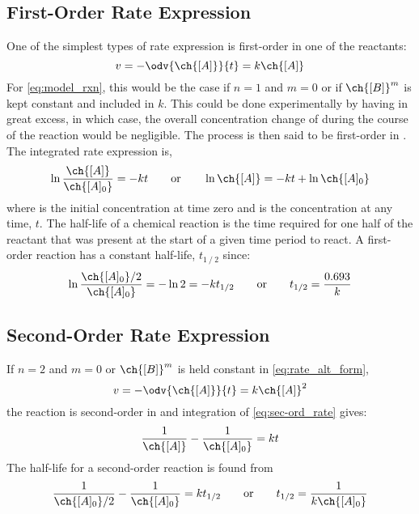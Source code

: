 \subsection{First-Order Rate Expression}
\label{subs:first-order_rate_expr}
One of the simplest types of rate expression is first-order in one of the reactants:
\begin{equation}
	v = -\odv{\ch{[A]}}{t} = k \ch{[A]}
	\label{eq:first-ord_rate}
\end{equation}
For \cref{eq:model_rxn}, this would be the case if \(n = 1\) and \(m = 0\) or if \(\ch{[B]}^m\) is kept constant and included in \(k\). 
This could be done experimentally by having  in great excess, in which case, the overall concentration change of  during the course of the reaction would be negligible. 
The process is then said to be first-order in . 
The integrated rate expression is,
\begin{equation}
	\ln{\frac{\ch{[A]}}{\ch{[A]_0}}} = -k t \qquad \text{or} \qquad \ln{\ch{[A]}} = -k t + \ln{\ch{[A]_0}}
	\label{eq:fo_int_rate}
\end{equation}
where  is the initial concentration  at time zero and \ch{[A]} is the concentration at any time, \(t\). 
The half-life of a chemical reaction is the time required for one half of the reactant that was present at the start of a given time period to react. 
A first-order reaction has a constant half-life, \(t_{1⁄2}\) since:
\begin{equation}
	\ln{\frac{\ch{[A]_{0}}/2}{\ch{[A]_{0}}}} = - \ln{2} = - k t_{1/2} \qquad \text{or} \qquad t_{1/2} = \frac{0.693}{k}
	\label{eq:fo_half_life}
\end{equation}

\subsection{Second-Order Rate Expression}
\label{subs:second-order_rate_expr}

If \(n=2\) and \(m=0\) or \(\ch{[B]}^m\) is held constant in \cref{eq:rate_alt_form}, 
\begin{equation}
	v = -\odv{\ch{[A]}}{t} = k \ch{[A]}^2
	\label{eq:sec-ord_rate}
\end{equation}
the reaction is second-order in  and integration of \cref{eq:sec-ord_rate} gives:
\begin{equation}
	\frac{1}{\ch{[A]}} - \frac{1}{\ch{[A]_0}} = k t
	\label{eq:so_int_rate}
\end{equation}
The half-life for a second-order reaction is found from 
\begin{equation}
	\frac{1}{\ch{[A]_0}/2} - \frac{1}{\ch{[A]_0}} = k t_{1/2} \qquad \text{or} \qquad t_{1/2} = \frac{1}{k \ch{[A]_0}}
	\label{eq:so_half_life}
\end{equation}

